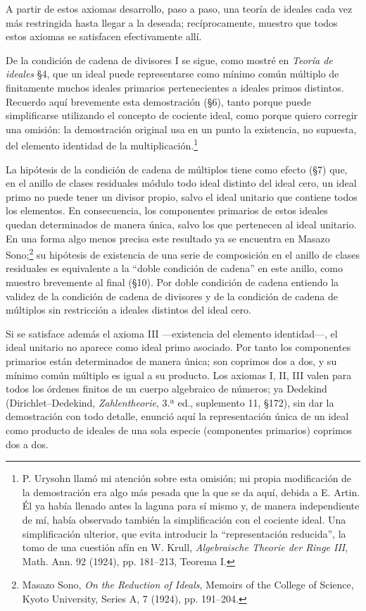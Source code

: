 \documentclass[11pt]{article}
\begin{document}
A partir de estos axiomas desarrollo, paso a paso, una teoría de ideales cada vez más restringida hasta llegar a la deseada; recíprocamente, muestro que todos estos axiomas se satisfacen efectivamente allí.

De la condición de cadena de divisores I se sigue, como mostré en \emph{Teoría de ideales} §4, que un ideal puede representarse como mínimo común múltiplo de finitamente muchos ideales primarios pertenecientes a ideales primos distintos. Recuerdo aquí brevemente esta demostración (§6), tanto porque puede simplificarse utilizando el concepto de cociente ideal, como porque quiero corregir una omisión: la demostración original usa en un punto la existencia, no supuesta, del elemento identidad de la multiplicación.\footnote{P. Urysohn llamó mi atención sobre esta omisión; mi propia modificación de la demostración era algo más pesada que la que se da aquí, debida a E. Artin. Él ya había llenado antes la laguna para sí mismo y, de manera independiente de mí, había observado también la simplificación con el cociente ideal. Una simplificación ulterior, que evita introducir la ``representación reducida'', la tomo de una cuestión afín en W. Krull, \emph{Algebraische Theorie der Ringe III}, Math. Ann. 92 (1924), pp. 181--213, Teorema I.}

La hipótesis de la condición de cadena de múltiplos tiene como efecto (§7) que, en el anillo de clases residuales módulo todo ideal distinto del ideal cero, un ideal primo no puede tener un divisor propio, salvo el ideal unitario que contiene todos los elementos. En consecuencia, los componentes primarios de estos ideales quedan determinados de manera única, salvo los que pertenecen al ideal unitario. En una forma algo menos precisa este resultado ya se encuentra en Masazo Sono;\footnote{Masazo Sono, \emph{On the Reduction of Ideals}, Memoirs of the College of Science, Kyoto University, Series A, 7 (1924), pp. 191--204.} su hipótesis de existencia de una serie de composición en el anillo de clases residuales es equivalente a la ``doble condición de cadena'' en este anillo, como muestro brevemente al final (§10). Por doble condición de cadena entiendo la validez de la condición de cadena de divisores y de la condición de cadena de múltiplos sin restricción a ideales distintos del ideal cero.

Si se satisface además el axioma III ---existencia del elemento identidad---, el ideal unitario no aparece como ideal primo asociado. Por tanto los componentes primarios están determinados de manera única; son coprimos dos a dos, y su mínimo común múltiplo es igual a su producto. Los axiomas I, II, III valen para todos los órdenes finitos de un cuerpo algebraico de números; ya Dedekind (Dirichlet--Dedekind, \emph{Zahlentheorie}, 3.ª ed., suplemento 11, §172), sin dar la demostración con todo detalle, enunció aquí la representación única de un ideal como producto de ideales de una sola especie (componentes primarios) coprimos dos a dos.
\end{document}
